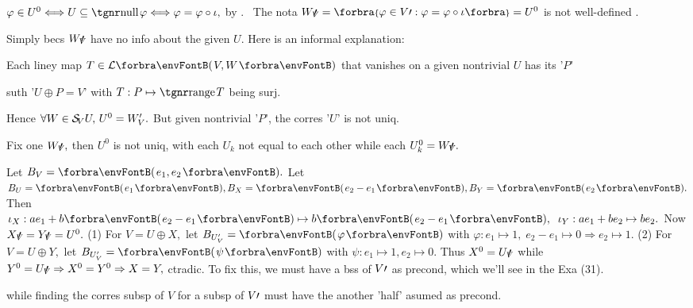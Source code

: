 \SepLine

$\varphi\in U^0\Longleftrightarrow U\subseteq\null\varphi\Longleftrightarrow\varphi=\varphi\circ\iota,$ by .\PfEnd\vspace{3pt}
\,\,\,The nota $W_V\upapostrophe=\Bra{\varphi\in V\apostrophe:\varphi=\varphi\circ\iota}=U^0$ is not well-defined .\par
{}Simply becs $W_V\!\!\!\prime\,$ have no info about the given $U.$ Here is an informal explanation:\par
{}Each liney map $T\in\Lm{V,W}$ that vanishes on a given nontrivial $U$ has its '$P$'\par
{} suth '$U\oplus P=V$' with $T:P\mapsto\range T$ being surj.\par
{}Hence $\forall W\in\mathcal{S}_{\!V}U,\,U^0=W_{V}'.$ But given nontrivial '$P$', the corres '$U$' is not uniq.\par
{}Fix one $W_V\!\!\!\prime\,,$ then $U^0$ is not uniq, with each $U_k$ not equal to each other while each $U_k^0=W_V\!\!\!\prime\,.$\par\vspace{2pt}
\AExa Let $B_V=\Par{e_1,e_2}.$ Let $B_U=\Par{e_1},B_X=\Par{e_2-e_1},B_Y=\Par{e_2}.$\parExa
Then $\iota_X:ae_1+b\Par{e_2-e_1}\mapsto b\Par{e_2-e_1},\;\;\iota_Y:ae_1+be_2\mapsto be_2.$ Now $X_V\!\!\!\prime\,=Y_V\!\!\!\prime\,=U^0.$\parExa
(1) For $V=U\oplus X,$ let $B_{U_V'}=\Par{\varphi}$ with $\varphi:e_1\mapsto 1,\;e_2-e_1\mapsto 0\Rightarrow e_2\mapsto 1.$\parExa
(2) For $V=U\oplus Y,$ let $B_{U_V'}=\Par{\psi}$ with $\psi:e_1\mapsto 1,e_2\mapsto 0.$\parExa
Thus $X^0=U_V\!\!\!\prime\,$ while $Y^0=U_V\!\!\!\prime\,\Rightarrow X^0=Y^0\Rightarrow X=Y,$ ctradic.\parExa
To fix this, we must have a bss of $V\prime$ as precond, which we'll see in the {\NOTEFOR} Exa (31).\par\vspace{2pt}
\vspace{-2pt}\parNot
{\tgsl while finding the corres subsp of $V$ for a subsp of $V\prime$ must have the another 'half' asumed as precond.}
\SepLine\pagebreak

